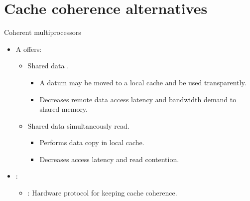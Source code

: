 \section{Cache coherence alternatives}

\begin{frame}[t]{Coherent multiprocessors}
\begin{itemize}
  \item A  offers:
    \begin{itemize}
      
      \item Shared data .
        \begin{itemize}
          \item A datum may be moved to a local cache and be used transparently.
          \item Decreases remote data access latency and bandwidth demand to shared memory.
        \end{itemize}
      
      \item Shared data  simultaneously read.
        \begin{itemize}
          \item Performs data copy in local cache.
          \item Decreases access latency and read contention.
        \end{itemize}
    \end{itemize}

  \item {}:
    \begin{itemize}
      \item {}: 
            Hardware protocol for keeping cache coherence.
    \end{itemize}
\end{itemize}
\end{frame}

